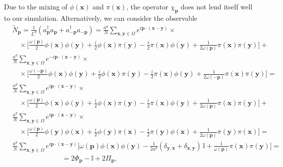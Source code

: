 \documentclass[a4paper,10pt]{report}
\begin{document}
Due to the mixing of $\phi(\mathbf{x})$ and $\pi(\mathbf{x})$, the operator $\chi_\mathbf{p}$ does not lend itself well to our simulation. Alternatively, we can consider the observable
\begin{align}
&\widetilde{N}_\mathbf{p} = \frac{1}{L^d}(a^\dag_\mathbf{p}a_\mathbf{p} + a^\dag_{-\mathbf{p}}a_{-\mathbf{p}}) = \frac{a^d}{N}\sum_{\mathbf{x},\mathbf{y}\in\Omega}e^{i\mathbf{p}\cdot(\mathbf{x}-\mathbf{y})}\times\nonumber\\
&\quad\times\bigg[\frac{\omega(\mathbf{p})}{2}\phi(\mathbf{x})\phi(\mathbf{y}) + \frac{i}{2}\phi(\mathbf{x})\pi(\mathbf{y}) - \frac{i}{2}\pi(\mathbf{x})\phi(\mathbf{y}) + \frac{1}{2\omega(\mathbf{p})}\pi(\mathbf{x})\pi(\mathbf{y})\bigg] + \nonumber\\
&\frac{a^d}{N}\sum_{\mathbf{x},\mathbf{y}\in\Omega}e^{-i\mathbf{p}\cdot(\mathbf{x}-\mathbf{y})}\times\nonumber\\
&\quad\times\bigg[\frac{\omega(-\mathbf{p})}{2}\phi(\mathbf{x})\phi(\mathbf{y}) + \frac{i}{2}\phi(\mathbf{x})\pi(\mathbf{y}) - \frac{i}{2}\pi(\mathbf{x})\phi(\mathbf{y}) + \frac{1}{2\omega(-\mathbf{p})}\pi(\mathbf{x})\pi(\mathbf{y})\bigg] = \nonumber\\
&\frac{a^d}{N}\sum_{\mathbf{x},\mathbf{y}\in\Omega}e^{i\mathbf{p}\cdot(\mathbf{x}-\mathbf{y})}\times\nonumber\\
&\quad\times\bigg[\frac{\omega(\mathbf{p})}{2}\phi(\mathbf{x})\phi(\mathbf{y}) + \frac{i}{2}\phi(\mathbf{x})\pi(\mathbf{y}) - \frac{i}{2}\pi(\mathbf{x})\phi(\mathbf{y}) + \frac{1}{2\omega(\mathbf{p})}\pi(\mathbf{x})\pi(\mathbf{y})\bigg] + \nonumber\\
&\frac{a^d}{N}\sum_{\mathbf{x},\mathbf{y}\in\Omega}e^{i\mathbf{p}\cdot(\mathbf{x}-\mathbf{y})}\times\nonumber\\
&\quad\times\bigg[\frac{\omega(\mathbf{p})}{2}\phi(\mathbf{y})\phi(\mathbf{x}) + \frac{i}{2}\phi(\mathbf{y})\pi(\mathbf{x}) - \frac{i}{2}\pi(\mathbf{y})\phi(\mathbf{x}) + \frac{1}{2\omega(\mathbf{p})}\pi(\mathbf{y})\pi(\mathbf{x})\bigg] = \nonumber\\
&\frac{a^d}{N}\sum_{\mathbf{x},\mathbf{y}\in\Omega}e^{i\mathbf{p}\cdot(\mathbf{x}-\mathbf{y})}\bigg[\omega(\mathbf{p})\phi(\mathbf{x})\phi(\mathbf{y}) - \frac{1}{2a^d}(\delta_{\mathbf{y},\mathbf{x}}+\delta_{\mathbf{x},\mathbf{y}})\,\mathbb{I} + \frac{1}{\omega(\mathbf{p})}\pi(\mathbf{x})\pi(\mathbf{y})\bigg] = \nonumber\\
&\hspace{3cm}=2\Phi_\mathbf{p} - \mathbb{I} + 2\Pi_\mathbf{p},
\end{align}
\end{document}
